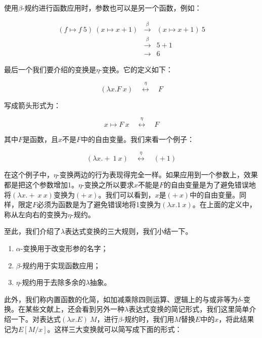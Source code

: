 \documentclass[UTF8]{article}
\begin{document}
使用$\beta$-规约进行函数应用时，参数也可以是另一个函数，例如：

\[
\begin{array}{rcl}
(f \mapsto f\ 5)\ (x \mapsto x + 1) & \overset{\beta}{\longrightarrow} & (x \mapsto x + 1)\ 5 \\
                                    & \overset{\beta}{\longrightarrow} & 5 + 1 \\
                                    & \longrightarrow & 6
\end{array}
\]

最后一个我们要介绍的变换是$\eta$-变换。它的定义如下：

\[
(\lambda x . F\ x) \quad \overset{\eta}{\longleftrightarrow} \quad F
\]

写成箭头形式为：

\[
x \mapsto F\ x \quad \overset{\eta}{\longleftrightarrow} \quad F
\]

其中$F$是函数，且$x$不是$F$中的自由变量。我们来看一个例子：

\[
(\lambda x . +\ 1\ x) \quad \overset{\eta}{\longleftrightarrow} \quad (+\ 1)
\]

在这个例子中，$\eta$-变换两边的行为表现得完全一样。如果应用到一个参数上，效果都是把这个参数增加1。$\eta$-变换之所以要求$x$不能是$F$的自由变量是为了避免错误地将$(\lambda x. +\ x\ x)$变换为$(+\ x)$。我们可以看到，$x$是$(+\ x)$中的自由变量。同样，限定$F$必须为函数是为了避免错误地将1变换为$(\lambda x . 1\ x)$。在上面的定义中，称从左向右的变换为$\eta$-规约。

至此，我们介绍了$\lambda$表达式变换的三大规则，我们小结一下。

\begin{enumerate}
\item $\alpha$-变换用于改变形参的名字；
\item $\beta$-规约用于实现函数应用；
\item $\eta$-规约用于去除多余的$\lambda$抽象。
\end{enumerate}

此外，我们称内置函数的化简，如加减乘除四则运算、逻辑上的与或非等为$\delta$-变换。在某些文献上，还会看到另外一种$\lambda$表达式变换的简记形式，我们这里简单介绍一下。对表达式$(\lambda x. E)\ M$，进行$\beta$-规约时，我们用$M$替换$E$中的$x$，将此结果记为$E[M/x]$。这样三大变换就可以简写成下面的形式：
\end{document}
